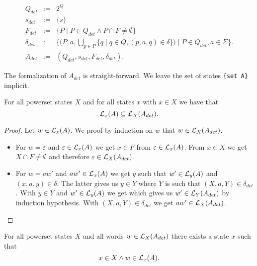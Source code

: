 \begin{eqnarray*}
    Q_{det} & := & 2^Q \\ %
    {s}_{det} & := & \{ s \} \\
    F_{det} & := & \{ P \; | \; P \in Q_{det} \wedge P \cap F \neq \emptyset \} \\
    \delta_{det} & := & \{ (P,a,\bigcup \limits _{p \in P} \{ q \; | \; q \in Q, (p,a,q) \in \delta \}) \; | \; P \in Q_{det}, a \in \Sigma \}.     \\
    A_{det} &:=&  (Q_{det}, s_{det}, F_{det}, \delta_{det}).
\end{eqnarray*}


The formalization of $A_{det}$ is straight-forward. 
We leave the set of states \lstinline!{set A}! implicit.


\begin{lemma}
    \label{nfa_to_dfa_complete}
    For all powerset states $X$ and for all states $x$ with $x \in X$ we have that
    \begin{equation*}
        \mathcal{L}_{x}(A) \subseteq \mathcal{L}_{X}(A_{det}).
    \end{equation*}
\end{lemma}

\begin{proof}
    Let $w \in \mathcal{L}_{x}(A)$. We proof by induction on $w$ that $w \in \mathcal{L}_{X}(A_{det})$. 
    \begin{itemize}
        \item
            For $w = \varepsilon$ and $\varepsilon \in \mathcal{L}_{x}(A)$ we get $x \in F$ from $\varepsilon \in \mathcal{L}_{x}(A)$. 
            From $x \in X$ we get $X \cap F \neq \emptyset$ and therefore $\varepsilon \in \mathcal{L}_{X}(A_{det})$.
        \item
            For $w = a w'$ and $a w' \in \mathcal{L}_{x}(A)$ we get $y$ such that $w' \in \mathcal{L}_{y}(A)$ and $(x,a,y) \in \delta$.
            The latter gives us $y \in Y$ where $Y$ is such that $(X, a, Y) \in \delta_{det}$.
            With $y \in Y$ and $w' \in \mathcal{L}_{y}(A)$ we get 
            which gives us $w' \in \mathcal{L}_{Y}(A_{det})$ by induction hypothesis.
            With $(X, a, Y) \in \delta_{det}$ we get $a w' \in \mathcal{L}_{X}(A_{det})$.
    \end{itemize}
\end{proof}


\begin{lemma}
    \label{nfa_to_dfa_sound}
    For all powerset states $X$ and all words $w \in \mathcal{L}_{X}(A_{det})$ there exists a state $x$ such that 
    \begin{equation*}
        x \in X \wedge
        w \in \mathcal{L}_{x}(A).
    \end{equation*}
\end{lemma}

